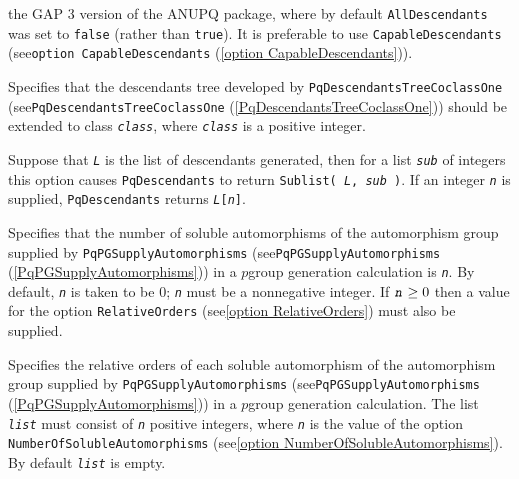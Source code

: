 \documentclass[a4paper,11pt]{report}
\begin{document}
{{\begin{description}
the \textsf{GAP} 3 version of the \textsf{ANUPQ} package, where by default \texttt{AllDescendants} was set to \texttt{false} (rather than \texttt{true}). It is preferable to use \texttt{CapableDescendants} (see{\nobreakspace}\texttt{option CapableDescendants} (\ref{option CapableDescendants})). 
\item[{\texttt{TreeDepth := \mbox{\texttt{\mdseries\slshape class}}} \label{option TreeDepth}\index{option TreeDepth}}]  Specifies that the descendants tree developed by \texttt{PqDescendantsTreeCoclassOne} (see{\nobreakspace}\texttt{PqDescendantsTreeCoclassOne} (\ref{PqDescendantsTreeCoclassOne})) should be extended to class \mbox{\texttt{\mdseries\slshape class}}, where \mbox{\texttt{\mdseries\slshape class}} is a positive integer. 
\item[{\texttt{SubList := \mbox{\texttt{\mdseries\slshape sub}}} \label{option SubList}\index{option SubList}}]  Suppose that \mbox{\texttt{\mdseries\slshape L}} is the list of descendants generated, then for a list \mbox{\texttt{\mdseries\slshape sub}} of integers this option causes \texttt{PqDescendants} to return \texttt{Sublist( \mbox{\texttt{\mdseries\slshape L}}, \mbox{\texttt{\mdseries\slshape sub}} )}. If an integer \mbox{\texttt{\mdseries\slshape n}} is supplied, \texttt{PqDescendants} returns \texttt{\mbox{\texttt{\mdseries\slshape L}}[\mbox{\texttt{\mdseries\slshape n}}]}. 
\item[{\texttt{NumberOfSolubleAutomorphisms := \mbox{\texttt{\mdseries\slshape n}}} \label{option NumberOfSolubleAutomorphisms}\index{option NumberOfSolubleAutomorphisms}}]  Specifies that the number of soluble automorphisms of the automorphism group
supplied by \texttt{PqPGSupplyAutomorphisms} (see{\nobreakspace}\texttt{PqPGSupplyAutomorphisms} (\ref{PqPGSupplyAutomorphisms})) in a $p$\texttt{}group generation calculation is \mbox{\texttt{\mdseries\slshape n}}. By default, \mbox{\texttt{\mdseries\slshape n}} is taken to be $0$; \mbox{\texttt{\mdseries\slshape n}} must be a non\texttt{}negative integer. If $\mbox{\texttt{\mdseries\slshape n}} \ge 0$ then a value for the option \texttt{RelativeOrders} (see{\nobreakspace}\ref{option RelativeOrders}) must also be supplied. 
\item[{\texttt{RelativeOrders := \mbox{\texttt{\mdseries\slshape list}}} \label{option RelativeOrders}\index{option RelativeOrders}}]  Specifies the relative orders of each soluble automorphism of the automorphism
group supplied by \texttt{PqPGSupplyAutomorphisms} (see{\nobreakspace}\texttt{PqPGSupplyAutomorphisms} (\ref{PqPGSupplyAutomorphisms})) in a $p$\texttt{}group generation calculation. The list \mbox{\texttt{\mdseries\slshape list}} must consist of \mbox{\texttt{\mdseries\slshape n}} positive integers, where \mbox{\texttt{\mdseries\slshape n}} is the value of the option \texttt{NumberOfSolubleAutomorphisms} (see{\nobreakspace}\ref{option NumberOfSolubleAutomorphisms}). By default \mbox{\texttt{\mdseries\slshape list}} is empty. 

\end{description}}}
\end{document}
